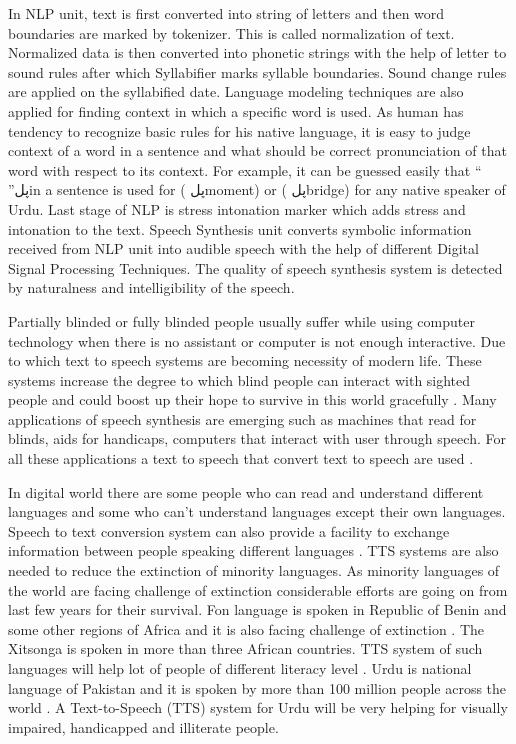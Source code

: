 In NLP unit, text is first converted into string of letters and then word boundaries are marked by
tokenizer. This is called normalization of text. Normalized data is then converted into phonetic strings
with the help of letter to sound rules after which Syllabifier marks syllable boundaries. Sound change
rules are applied on the syllabified date. Language modeling techniques are also applied for finding
context in which a specific word is used. As human has tendency to recognize basic rules for his native
language, it is easy to judge context of a word in a sentence and what should be correct pronunciation of
that word with respect to its context. For example, it can be guessed easily that “ ”پلin a sentence is used
for ( پلmoment) or ( پلbridge) for any native speaker of Urdu. Last stage of NLP is stress intonation
marker which adds stress and intonation to the text. Speech Synthesis unit converts symbolic information
received from NLP unit into audible speech with the help of different Digital Signal Processing
Techniques. The quality of speech synthesis system is detected by naturalness and intelligibility of the speech.

Partially blinded or fully blinded people usually suffer while using computer technology when there is no assistant or 
computer is not enough interactive. Due to which text to speech systems are becoming necessity of modern life. 
These systems increase the degree to which blind people can interact with sighted 
people \cite{klatt1987review} and could boost up their hope to survive in this world 
gracefully \cite{eide2004corpus}. Many applications of speech synthesis are emerging such as 
machines that read for blinds, aids for handicaps, computers that interact with user through speech. 
For all these applications a text to
speech that convert text to speech are used \cite{klatt1982klattalk}.


In digital world there are some people who can read and understand different languages and some
who can’t understand languages except their own languages. Speech to text conversion system can
also provide a facility to exchange information between people speaking different languages \cite{khilari2015review}. TTS systems are also needed to reduce the extinction of
minority languages. As minority languages of the world are facing challenge of extinction
considerable efforts are going on from last few years for their survival. Fon language is spoken in
Republic of Benin and some other regions of Africa and it is also facing challenge of extinction \cite{dagba2014text}. The Xitsonga is spoken in more than three African countries.
TTS system of such languages will help lot of people of different literacy level \cite{baloyi2012text}.
Urdu is national language of Pakistan and it is spoken by more than 100 million people across the world \cite{top_30_languages}.
A Text-to-Speech (TTS) system for Urdu will be very helping for visually impaired, handicapped and illiterate people.

